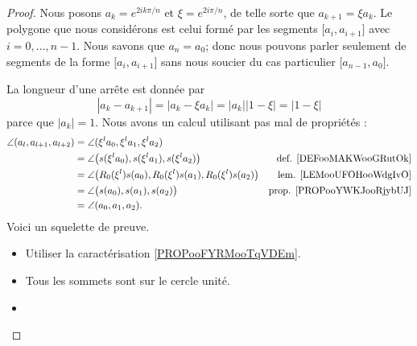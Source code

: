 \begin{proof}
	Nous posons \( a_k= e^{2ik\pi /n}\) et \( \xi= e^{2i\pi/n}\), de telle sorte que \( a_{k+1}=\xi a_k\). Le polygone que nous considérons est celui formé par les segments \( \mathopen[ a_i , a_{i+1} \mathclose]\) avec \( i=0,\ldots, n-1\). Nous savons que \( a_n=a_0\); donc nous pouvons parler seulement de segments de la forme \( \mathopen[ a_i , a_{i+1} \mathclose]\) sans nous soucier du cas particulier \( \mathopen[ a_{n-1} , a_0 \mathclose]\).
	\begin{subproof}
		\spitem[Longueurs]
		La longueur d'une arrête est donnée par
		\begin{equation}
			| a_k-a_{k+1} |=| a_k-\xi a_k |=| a_k | |1-\xi |=| 1-\xi |
		\end{equation}
		parce que \( | a_k |=1\).
		\spitem[Angles]
		Nous avons un calcul utilisant pas mal de propriétés :
		\begin{subequations}
			\begin{align}
				\angle(a_l,a_{l+1},a_{l+2}) & =\angle(\xi^la_0,\xi^la_1,\xi^la_2)                                                                           \\
				                            & =\angle\big( s(\xi^la_0),s(\xi^la_1),s(\xi^la_2) \big)                & \text{def. \ref{DEFooMAKWooGRutOk}}   \\
				                            & =\angle\big( R_0(\xi^l)s(a_0),R_0(\xi^l)s(a_1),R_0(\xi^l)s(a_2) \big) & \text{lem. \ref{LEMooUFOHooWdgIvO}}   \\
				                            & =\angle\big( s(a_0), s(a_1), s(a_2) \big)                             & \text{prop. \ref{PROPooYWKJooRjybUJ}} \\
				                            & =\angle(a_0,a_1,a_2).
			\end{align}
		\end{subequations}
		\spitem[Convexe]
		Voici un squelette de preuve.
		\begin{itemize}
			\item Utiliser la caractérisation \ref{PROPooFYRMooTqVDEm}.
			\item
			      Tous les sommets sont sur le cercle unité.
			\item

\end{itemize}
\end{subproof}
\end{proof}
